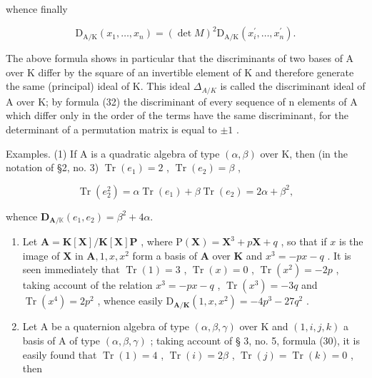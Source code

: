 whence finally

\[
\mathrm{D} _ {\mathrm{A} / \mathrm{K}} (x _ {1}, \dots , x _ {n}) = (\det M) ^ {2} \mathrm{D} _ {\mathrm{A} / \mathrm{K}} (x _ {i} ^ {\prime}, \dots , x _ {n} ^ {\prime}).\tag{32}
\]

The above formula shows in particular that the discriminants of two bases of A over K differ by the square of an invertible element of K and therefore generate the same (principal) ideal of K. This ideal \(\Delta_{A/K}\) is called the discriminant ideal of A over K; by formula (32) the discriminant of every sequence of n elements of A which differ only in the order of the terms have the same discriminant, for the determinant of a permutation matrix is equal to \(\pm1\) .

Examples. (1) If A is a quadratic algebra of type \((\alpha, \beta)\) over K, then (in the notation of §2, no. 3) \(\operatorname{Tr}(e_1) = 2\) , \(\operatorname{Tr}(e_2) = \beta\) ,

\[
\operatorname{Tr} (e _ {2} ^ {2}) = \alpha \operatorname{Tr} (e _ {1}) + \beta \operatorname{Tr} (e _ {2}) = 2 \alpha + \beta^ {2},
\]

whence \(\mathbf{D}_{\mathbf{A} / \mathbb{K}}(e_1,e_2) = \beta^2 +4\alpha .\)

\begin{enumerate}
\def\labelenumi{(\arabic{enumi})}
\setcounter{enumi}{1}
\item
  Let \(\mathbf{A} = \mathbf{K}[\mathbf{X}] / \mathbf{K}[\mathbf{X}]\mathbf{P}\) , where \(\mathrm{P}(\mathbf{X}) = \mathbf{X}^3 + p\mathbf{X} + q\) , so that if \(x\) is the image of \(\mathbf{X}\) in \(\mathbf{A}, 1, x, x^2\) form a basis of \(\mathbf{A}\) over \(\mathbf{K}\) and \(x^3 = -px - q\) . It is seen immediately that \(\operatorname{Tr}(1) = 3\) , \(\operatorname{Tr}(x) = 0\) , \(\operatorname{Tr}(x^2) = -2p\) , taking account of the relation \(x^3 = -px - q\) , \(\operatorname{Tr}(x^3) = -3q\) and \(\operatorname{Tr}(x^4) = 2p^2\) , whence easily \(\mathrm{D}_{\mathbf{A} / \mathbf{K}}(1, x, x^2) = -4p^3 - 27q^2\) .
\item
  Let A be a quaternion algebra of type \((\alpha, \beta, \gamma)\) over K and \((1, i, j, k)\) a basis of A of type \((\alpha, \beta, \gamma)\) ; taking account of § 3, no. 5, formula (30), it is easily found that \(\operatorname{Tr}(1) = 4\) , \(\operatorname{Tr}(i) = 2\beta\) , \(\operatorname{Tr}(j) = \operatorname{Tr}(k) = 0\) , then
\end{enumerate}

